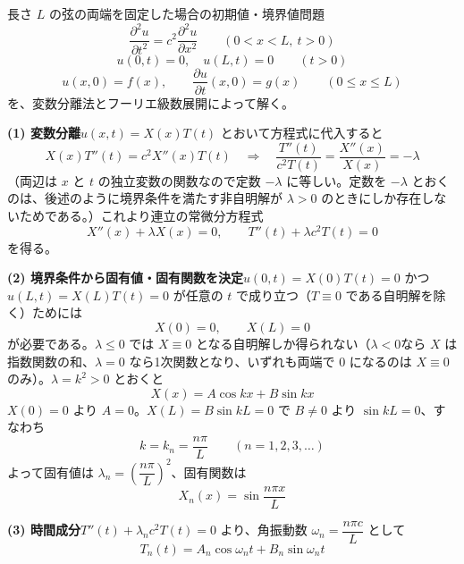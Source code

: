 \documentclass[a4paper,11pt]{article}
\begin{document}


\noindent
長さ $L$ の弦の両端を固定した場合の初期値・境界値問題
\[
\frac{\partial^{2} u}{\partial t^{2}} = c^{2}\frac{\partial^{2} u}{\partial x^{2}} \qquad (0 < x < L,\ t > 0)
\]
\[
u(0,t) = 0,\quad u(L,t) = 0 \qquad (t > 0)
\]
\[
u(x,0) = f(x), \qquad \frac{\partial u}{\partial t}(x,0) = g(x) \qquad (0 \le x \le L)
\]
を、変数分離法とフーリエ級数展開によって解く。

\medskip
\noindent
\textbf{(1) 変数分離}\quad $u(x,t) = X(x)T(t)$ とおいて方程式に代入すると
\[
X(x)T''(t) = c^{2}X''(x)T(t)
\quad\Longrightarrow\quad
\frac{T''(t)}{c^{2}T(t)} = \frac{X''(x)}{X(x)} = -\lambda
\]
（両辺は $x$ と $t$ の独立変数の関数なので定数 $-\lambda$ に等しい。定数を $-\lambda$ とおくのは、後述のように境界条件を満たす非自明解が $\lambda > 0$ のときにしか存在しないためである。）これより連立の常微分方程式
\[
X''(x) + \lambda X(x) = 0, \qquad T''(t) + \lambda c^{2} T(t) = 0
\]
を得る。

\medskip
\noindent
\textbf{(2) 境界条件から固有値・固有関数を決定}\quad $u(0,t) = X(0)T(t) = 0$ かつ $u(L,t) = X(L)T(t) = 0$ が任意の $t$ で成り立つ（$T \equiv 0$ である自明解を除く）ためには
\[
X(0) = 0, \qquad X(L) = 0
\]
が必要である。$\lambda \le 0$ では $X \equiv 0$ となる自明解しか得られない（$\lambda<0$なら $X$ は指数関数の和、$\lambda=0$ なら1次関数となり、いずれも両端で $0$ になるのは $X\equiv0$ のみ）。$\lambda = k^{2} > 0$ とおくと
\[
X(x) = A\cos kx + B\sin kx
\]
$X(0)=0$ より $A=0$。$X(L)=B\sin kL = 0$ で $B \neq 0$ より $\sin kL = 0$、すなわち
\[
k = k_{n} = \frac{n\pi}{L} \qquad (n = 1,2,3,\dots)
\]
よって固有値は $\lambda_{n} = \left(\dfrac{n\pi}{L}\right)^{2}$、固有関数は
\[
X_{n}(x) = \sin\frac{n\pi x}{L}
\]

\medskip
\noindent
\textbf{(3) 時間成分}\quad $T''(t) + \lambda_{n}c^{2}T(t) = 0$ より、角振動数 $\omega_{n} = \dfrac{n\pi c}{L}$ として
\[
T_{n}(t) = A_{n}\cos\omega_{n}t + B_{n}\sin\omega_{n}t
\]
\end{document}
